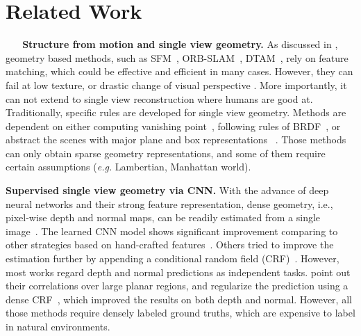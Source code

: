 
\vspace{-0\baselineskip}
\section{Related Work}
\label{sec:related}

\textbf{~~~Structure from motion and single view geometry.}
As discussed in , geometry based methods, such as SFM~\cite{wu2011visualsfm}, ORB-SLAM~\cite{mur2015orb}, DTAM~\cite{NewcombeLD11}, rely on feature matching, which could be effective and efficient in many cases. 
However, they can fail at low texture, or drastic change of visual perspective \etc. More importantly, it can not extend to single view reconstruction where humans are good at.
Traditionally, specific rules are developed for single view geometry. Methods are dependent on either computing vanishing point~\cite{HoiemEH07}, following rules of BRDF~\cite{prados2006shape}, or abstract the scenes with major plane and box representations~\cite{DBLP:conf/iccv/SchwingFPU13,DBLP:conf/3dim/SrajerSPP14} \etc. Those methods can only obtain sparse geometry representations, and some of them require certain assumptions (\textit{e.g.} Lambertian, Manhattan world).

\textbf{Supervised single view geometry via CNN.}
With the advance of deep neural networks and their strong feature representation, dense geometry, i.e., pixel-wise depth and normal maps, can be readily estimated from a single image~\cite{wang2015designing,eigen2015predicting,laina2016deeper}. The learned CNN model shows significant improvement comparing to other strategies based on hand-crafted features~\cite{karsch2014depth,ladicky2014pulling,zeisl2014discriminatively}. Others tried to improve the estimation further by appending a conditional random field (CRF)~\cite{DBLP:conf/cvpr/WangSLCPY15,Liu_2015_CVPR,li2015depth}. 
However, most works regard depth and normal predictions as independent tasks. \cite{peng2016depth} point out their correlations over large planar regions, and regularize the prediction using a dense CRF~\cite{kong2015intrinsic}, which improved the results on both depth and normal. However, all those methods require densely labeled ground truths, which are expensive to label in natural environments.




